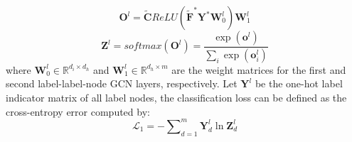 \documentclass[conference]{IEEEtran}
\begin{document}
\begin{equation}
\mathbf{O}^l=\tilde{\mathbf{C}} ReLU (\tilde{\mathbf{F}}^* \mathbf{Y}^* \mathbf{W}_0^l)\mathbf{W}_1^l
\end{equation}
\begin{equation}
\mathbf{Z}^l=softmax(\mathbf{O}^l)=\frac{{\exp (\mathbf{o}^l )}}{{\sum\nolimits_i {\exp (\mathbf{o}_i^l )} }}
\end{equation}
where $\mathbf{W}_0^l \in \mathbb{R}^{d_i \times d_h}$ and $\mathbf{W}_1^l \in \mathbb{R}^{d_h \times m}$ are the weight matrices for the first and second label-label-node GCN layers, respectively. Let $\mathbf{Y}^l$ be the one-hot label indicator matrix of all label nodes, the classification loss can be defined as the cross-entropy error computed by:
\begin{equation}
\mathcal{L}_1=-\sum\nolimits_{d = 1}^m {\mathbf{Y}_d^l \ln \mathbf{Z}_d^l }
\end{equation}
\end{document}
